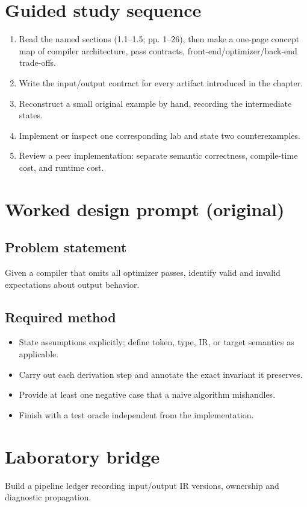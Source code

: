 \documentclass[10pt,letterpaper]{article}
\begin{document}
\section{Guided study sequence}
\begin{enumerate}
\item Read the named sections (1.1--1.5; pp. 1--26), then make a one-page concept map of compiler architecture, pass contracts, front-end/optimizer/back-end trade-offs.
\item Write the input/output contract for every artifact introduced in the chapter.
\item Reconstruct a small original example by hand, recording the intermediate states.
\item Implement or inspect one corresponding lab and state two counterexamples.
\item Review a peer implementation: separate semantic correctness, compile-time cost, and runtime cost.
\end{enumerate}

\section{Worked design prompt (original)}
\subsection{Problem statement}
Given a compiler that omits all optimizer passes, identify valid and invalid expectations about output behavior.
\subsection{Required method}
\begin{itemize}
\item State assumptions explicitly; define token, type, IR, or target semantics as applicable.
\item Carry out each derivation step and annotate the exact invariant it preserves.
\item Provide at least one negative case that a naive algorithm mishandles.
\item Finish with a test oracle independent from the implementation.
\end{itemize}


\section{Laboratory bridge}
Build a pipeline ledger recording input/output IR versions, ownership and diagnostic propagation.
\end{document}

